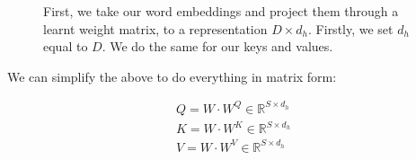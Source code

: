 \documentclass[11pt]{article}
\begin{document}
\begin{figure}[H]
    \centering
    \caption*{First, we take our word embeddings and project them through a learnt weight matrix, to a representation $D\times d_h$. Firstly, we set $d_h$ equal to $D$. We do the same for our keys and values.}
\end{figure}

We can simplify the above to do everything in matrix form:

\begin{gather}
    Q = W \cdot W^Q \in \mathbb R^{S \times d_h} \\
    K = W \cdot W^K \in \mathbb R^{S \times d_h} \\
    V = W \cdot W^V \in \mathbb R^{S \times d_h}
\end{gather}
\end{document}
